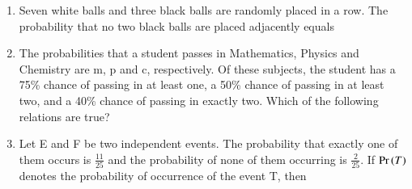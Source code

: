 \documentclass[journal,12pt,twocolumn,article]{IEEEtran}
\theoremstyle{remark}
\begin{document}
\begin{enumerate}[start = 3]
\begin{enumerate}
\end{enumerate}
\item Seven white balls and three black balls are randomly placed in a row. The probability that no two black balls are placed adjacently equals
\hfill{}
\begin{enumerate}
\end{enumerate}
\item The probabilities that a student passes in Mathematics, Physics and Chemistry are m, p and c, respectively. Of these subjects, the student has a 75\% chance of passing in at least one, a 50\% chance of passing in at least two, and a 40\% chance of passing in exactly two. Which of the following relations are true?
\hfill{}
\begin{enumerate}
\end{enumerate}
\item Let E and F be two independent events. The probability that exactly one of them occurs is $\frac{11}{25}$ and the probability of none of them occurring is $\frac{2}{25}$. If $\Pr\left(T\right)$ denotes the probability of occurrence of the event T, then
\hfill{}
\begin{enumerate}
\end{enumerate}
\end{enumerate}
\end{document}
